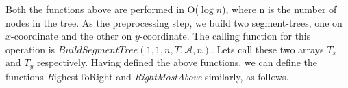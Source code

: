 \documentclass{article}
\newcommand{\Aa}{\mathcal{A}}
\begin{document}
%

\noindent Both the functions above are performed in O($\log{n}$), where n is the number of nodes in the tree. As the preprocessing step, we build two segment-trees, one on $x$-coordinate and the other on $y$-coordinate. The calling function for this operation is $BuildSegmentTree(1, 1, n, T, \Aa, n)$. Lets call these two arrays $T_{x}$ and $T_{y}$ respectively. Having defined the above functions, we can define the functions {\emph HighestToRight}  and {\em RightMostAbove} similarly, as follows.
\end{document}
